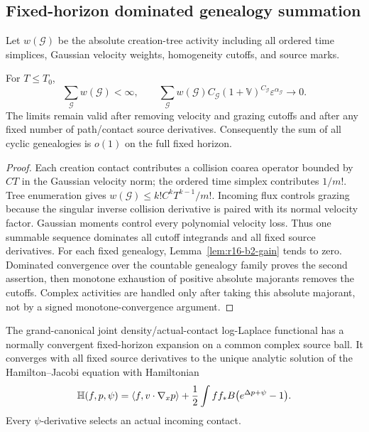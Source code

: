 \subsection{Fixed-horizon dominated genealogy summation}

Let \(w(\mathcal G)\) be the absolute creation-tree activity including all
ordered time simplices, Gaussian velocity weights, homogeneity cutoffs, and
source marks.

\begin{theorem}
\label{thm:r16-b2-majorant}
For \(T\le T_0\),
\[
 \sum_{\mathcal G}w(\mathcal G)<\infty,
 \qquad
 \sum_{\mathcal G}w(\mathcal G)
 C_{\mathcal G}(1+\mathbb V)^{C_{\mathcal G}}
 \varepsilon^{\alpha_{\mathcal G}}\longrightarrow0.
\]
The limits remain valid after removing velocity and grazing cutoffs and after
any fixed number of path/contact source derivatives.  Consequently the sum of
all cyclic genealogies is \(o(1)\) on the full fixed horizon.
\end{theorem}

\begin{proof}
Each creation contact contributes a collision coarea operator bounded by
\(CT\) in the Gaussian velocity norm; the ordered time simplex contributes
\(1/m!\).  Tree enumeration gives
\(w(\mathcal G)\le k!C^kT^{k-1}/m!\).  Incoming flux controls grazing because
the singular inverse collision derivative is paired with its normal velocity
factor.  Gaussian moments control every polynomial velocity loss.  Thus one
summable sequence dominates all cutoff integrands and all fixed source
derivatives.  For each fixed genealogy, Lemma~\ref{lem:r16-b2-gain} tends to
zero.  Dominated convergence over the countable genealogy family proves the
second assertion, then monotone exhaustion of positive absolute majorants
removes the cutoffs.  Complex activities are handled only after taking this
absolute majorant, not by a signed monotone-convergence argument.
\end{proof}

\begin{theorem}
\label{thm:r16-b2-pressure}
The grand-canonical joint density/actual-contact log-Laplace functional has a
normally convergent fixed-horizon expansion on a common complex source ball.
It converges with all fixed source derivatives to the unique analytic solution
of the Hamilton--Jacobi equation with Hamiltonian
\[
 \mathbb H(f,p,\psi)=
 \langle f,v\cdot\nabla_xp\rangle
 +{1\over2}\int ff_*B
 \bigl(e^{\Delta p+\psi}-1\bigr).
\]
Every \(\psi\)-derivative selects an actual incoming contact.
\end{theorem}

